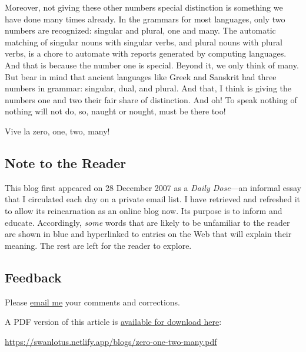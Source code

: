 \documentclass[
  a4paper,
]{article}
\begin{document}
Moreover, not giving these other numbers special distinction is
something we have done many times already. In the grammars for most
languages, only two numbers are recognized: singular and plural, one and
many. The automatic matching of singular nouns with singular verbs, and
plural nouns with plural verbs, is a chore to automate with reports
generated by computing languages. And that is because the number one is
special. Beyond it, we only think of many. But bear in mind that ancient
languages like Greek and Sanskrit had three numbers in grammar:
singular, dual, and plural. And that, I think is giving the numbers one
and two their fair share of distinction. And oh! To speak nothing of
nothing will not do, so, naught or nought, must be there too!

Vive la zero, one, two, many!

\hypertarget{note-to-the-reader}{%
\subsection{Note to the Reader}\label{note-to-the-reader}}

This blog first appeared on 28 December 2007 as a \emph{Daily Dose}---an
informal essay that I circulated each day on a private email list. I
have retrieved and refreshed it to allow its reincarnation as an online
blog now. Its purpose is to inform and educate. Accordingly, \emph{some}
words that are likely to be unfamiliar to the reader are shown in blue
and hyperlinked to entries on the Web that will explain their meaning.
The rest are left for the reader to explore.  \normalfont

\hypertarget{feedback}{%
\subsection{Feedback}\label{feedback}}

Please \href{mailto:feedback.swanlotus@gmail.com}{email me} your
comments and corrections.

\noindent A PDF version of this article is
\href{./zero-one-two-many.pdf}{available for download here}:

\begin{small}

\begin{sffamily}

\url{https://swanlotus.netlify.app/blogs/zero-one-two-many.pdf}

\end{sffamily}

\end{small}
\end{document}
